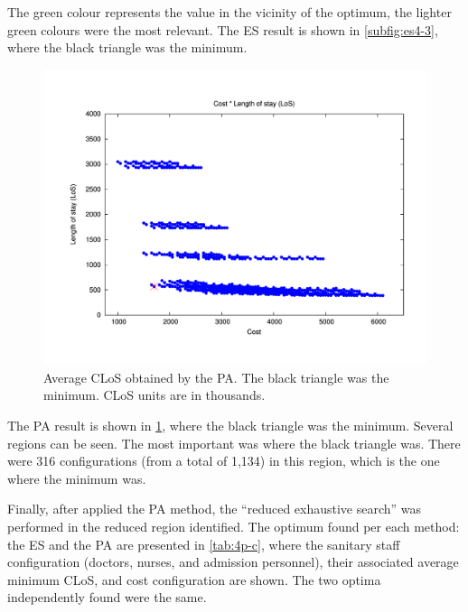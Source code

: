 \documentclass[11pt]{article} %
\begin{document}
The green colour represents the value in the vicinity of the optimum,
the lighter green colours were the most relevant. The ES result is
shown in \ref{subfig:es4-3}, where the black triangle was the minimum. 

\begin{figure}[H]
\centering{}\includegraphics[width=1\columnwidth,height=0.2\paperheight]{figs4/v03/6400-602-25-pipe-CLoS_min}
\caption{Average CLoS obtained by the PA. The black triangle was the minimum.
CLoS units are in thousands.\label{subfig:pipe4-3}}
\end{figure}

The PA result is shown in \ref{subfig:pipe4-3}, where the black triangle
was the minimum. Several regions can be seen. The most important was
where the black triangle was. There were 316 configurations (from
a total of 1,134) in this region, which is the one where the minimum
was.

Finally, after applied the PA method, the \textquotedblleft{}reduced exhaustive search\textquotedblright{}
was performed in the reduced region identified. The optimum
found per each method: the ES and the PA are presented in \ref{tab:4p-c}, where the sanitary staff
configuration (doctors, nurses, and admission personnel), their associated
average minimum CLoS, and cost configuration are shown. The two
optima independently found were the same. 
\end{document}
